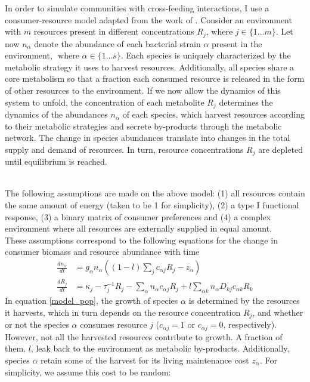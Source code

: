 \documentclass[12pt]{article}
\begin{document}
        	In order to simulate communities with cross-feeding interactions, I use a consumer-resource model adapted from the work of \cite{Marsland2019}. Consider an environment with $ m $ resources present in different concentrations $ R_{j} $, where $ j \in \{1 \dots m\} $. Let now $ n_{\alpha} $ denote the abundance of each bacterial strain $ \alpha $  present in the environment, $ \text{ where } \alpha \in \{1 \dots s\} $. Each species is uniquely characterized by the metabolic strategy it uses to harvest resources. Additionally, all species share a core metabolism so that a fraction each consumed resource is released in the form of other resources to the environment. If we now allow the dynamics of this system to unfold, the concentration of each metabolite $ R_j $ determines the dynamics of the abundances $ n_\alpha$ of each species, which harvest resources according to their metabolic strategies and secrete by-products through the metabolic network. The change in species abundances translate into changes in the total supply and demand of resources. In turn, resource concentrations $ R_j $ are depleted until equilibrium is reached. \par \\
        	The following assumptions are made on the above model: (1) all resources contain the same amount of energy (taken to be 1 for simplicity), (2) a type I functional response, (3) a binary matrix of consumer preferences and (4) a complex environment where all resources are externally supplied in equal amount.\\
        	These assumptions correspond to the following equations for the change in consumer biomass and resource abundance with time
    		\begin{align}
    		    \frac{dn_{\alpha}}{dt} &= g_{\alpha}n_{\alpha}\left((1-l)\sum_jc_{\alpha j}R_j - z_{\alpha}\right)\label{model_pop}\\
    		    \frac{dR_{j}}{dt} &= \kappa_j - \tau^{-1}_jR_j - \sum_{\alpha}n_{\alpha}c_{\alpha j}R_j + l\sum_{\alpha k}n_{\alpha}D_{kj}c_{\alpha k}R_k\label{model_rec}
    		\end{align}
        	In equation \ref{model_pop}, the growth of species $ {\alpha} $ is determined by the resources it harvests, which in turn depends on the resource concentration $ R_j $, and whether or not the species $ {\alpha} $ consumes resource $ j $ ($ c_{{\alpha}j} = 1 \text{ or } c_{{\alpha}j} = 0 $, respectively). However, not all the harvested resources contribute to growth. A fraction of them, $  l $, leak back to the environment as metabolic by-products. Additionally, species $ {\alpha} $ retain some of the harvest for its living maintenance cost $ z_{\alpha} $. For simplicity, we assume this cost to be random:
\end{document}
